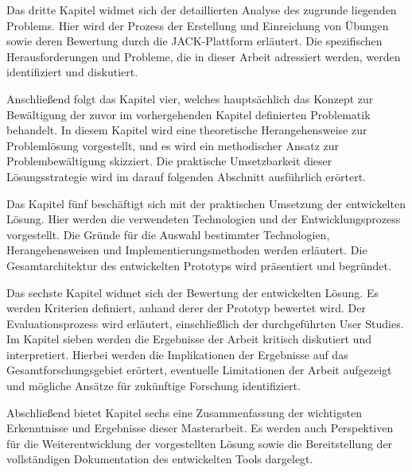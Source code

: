 Das dritte Kapitel widmet sich der detaillierten Analyse des zugrunde liegenden Problems. Hier wird der Prozess der Erstellung und Einreichung von Übungen sowie deren Bewertung durch die \gls{JACK}-Plattform erläutert. Die spezifischen Herausforderungen und Probleme, die in dieser Arbeit adressiert werden, werden identifiziert und diskutiert.

Anschließend folgt das Kapitel vier, welches hauptsächlich das Konzept zur Bewältigung der zuvor im vorhergehenden Kapitel definierten Problematik behandelt. In diesem Kapitel wird eine theoretische Herangehensweise zur Problemlösung vorgestellt, und es wird ein methodischer Ansatz zur Problembewältigung skizziert. Die praktische Umsetzbarkeit dieser Lösungsstrategie wird im darauf folgenden Abschnitt ausführlich erörtert.

Das Kapitel fünf beschäftigt sich mit der praktischen Umsetzung der entwickelten Lösung. Hier werden die verwendeten Technologien und der Entwicklungsprozess vorgestellt. Die Gründe für die Auswahl bestimmter Technologien, Herangehensweisen und Implementierungsmethoden werden erläutert. Die Gesamtarchitektur des entwickelten Prototyps wird präsentiert und begründet.

Das sechste Kapitel widmet sich der Bewertung der entwickelten Lösung. Es werden Kriterien definiert, anhand derer der Prototyp bewertet wird. Der Evaluationsprozess wird erläutert, einschließlich der durchgeführten User Studies. Im Kapitel sieben werden die Ergebnisse der Arbeit kritisch diskutiert und interpretiert. Hierbei werden die Implikationen der Ergebnisse auf das Gesamtforschungsgebiet erörtert, eventuelle Limitationen der Arbeit aufgezeigt und mögliche Ansätze für zukünftige Forschung identifiziert.

Abschließend bietet Kapitel sechs eine Zusammenfassung der wichtigsten Erkenntnisse und Ergebnisse dieser Masterarbeit. Es werden auch Perspektiven für die Weiterentwicklung der vorgestellten Lösung sowie die Bereitstellung der vollständigen Dokumentation des entwickelten Tools dargelegt.